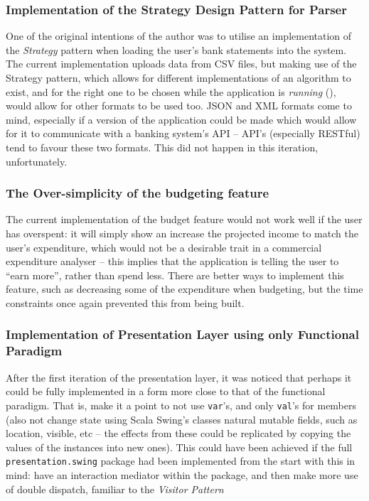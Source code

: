 \subsubsection{Implementation of the Strategy Design Pattern for Parser}
One of the original intentions of the author was to utilise an implementation
of the \emph{Strategy} pattern when loading the user's bank statements into the
system. The current implementation uploads data from CSV files, but making use
of the Strategy pattern, which allows for different implementations of an
algorithm to exist, and for the right one to be chosen while the application is
\emph{running} (\cite[][Ch.~8,~Location~3152]{nikolov2016scala}), would allow
for other formats to be used too. JSON and XML formats come to mind, especially
if a version of the application could be made which would allow for it to
communicate with a banking system's API -- API's (especially RESTful) tend to
favour these two formats. This did not happen in this iteration, unfortunately.

\subsubsection{The Over-simplicity of the budgeting feature}
The current implementation of the budget feature would not work well if
the user has overspent: it will simply show an increase the projected income to
match the user's expenditure, which would not be a desirable trait in a
commercial expenditure analyser -- this implies that the application is telling
the user to ``earn more'', rather than spend less. There are better ways to
implement this feature, such as decreasing some of the expenditure when
budgeting, but the time constraints once again prevented this from being built.


\subsubsection{Implementation of Presentation Layer using only Functional Paradigm}
After the first iteration of the presentation layer, it was noticed that
perhaps it could be fully implemented in a form more close to that of the
functional paradigm. That is, make it a point to not use \texttt{var}'s, and
only \texttt{val}'s for members (also not change state using Scala Swing's
classes natural mutable fields, such as location, visible, etc -- the effects
from these could be replicated by copying the values of the instances into new
ones). This could have been achieved if the full \texttt{presentation.swing}
package had been implemented from the start with this in mind: have an
interaction mediator within the package, and then make more use of double
dispatch, familiar to the \emph{Visitor Pattern}

